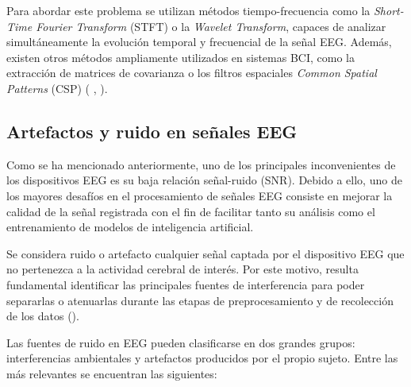 Para abordar este problema se utilizan métodos tiempo-frecuencia como la \textit{Short-Time Fourier Transform } (STFT) o la \textit{Wavelet Transform}, capaces de analizar simultáneamente la evolución temporal y frecuencial de la señal EEG. Además, existen otros métodos ampliamente utilizados en sistemas BCI, como la extracción de matrices de covarianza o los filtros espaciales \textit{Common Spatial Patterns} (CSP) (\cite{blankertz2008optimizing} , \cite{singh2021comprehensive}).

\subsection{Artefactos y ruido en señales EEG}
\label{subsec:artefactosEEG}

Como se ha mencionado anteriormente, uno de los principales inconvenientes de los dispositivos EEG es su baja relación señal-ruido (SNR). Debido a ello, uno de los mayores desafíos en el procesamiento de señales EEG consiste en mejorar la calidad de la señal registrada con el fin de facilitar tanto su análisis como el entrenamiento de modelos de inteligencia artificial.

Se considera ruido o artefacto cualquier señal captada por el dispositivo EEG que no pertenezca a la actividad cerebral de interés. Por este motivo, resulta fundamental identificar las principales fuentes de interferencia para poder separarlas o atenuarlas durante las etapas de preprocesamiento y de recolección de los datos (\cite{jiang2019removal}).

Las fuentes de ruido en EEG pueden clasificarse en dos grandes grupos: interferencias ambientales y artefactos producidos por el propio sujeto. Entre las más relevantes se encuentran las siguientes:

